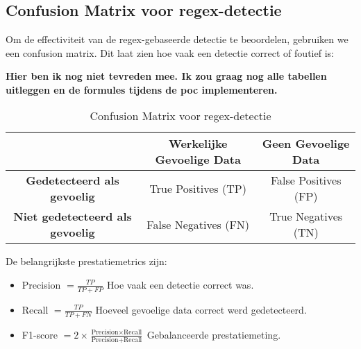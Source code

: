 \section{}
\label{sec:evaluatie_detectie}

\subsection{Confusion Matrix voor regex-detectie}
Om de effectiviteit van de regex-gebaseerde detectie te beoordelen, gebruiken we een confusion matrix. Dit laat zien hoe vaak een detectie correct of foutief is:

\textbf{Hier ben ik nog niet tevreden mee. Ik zou graag nog alle tabellen uitleggen en de formules tijdens de poc implementeren.}

\begin{table}[h]
    \centering
    \begin{tabular}{|c|c|c|}
        \hline
        \textbf{} & \textbf{Werkelijke Gevoelige Data} & \textbf{Geen Gevoelige Data} \\ \hline
        \textbf{Gedetecteerd als gevoelig} & True Positives (TP) & False Positives (FP) \\ \hline
        \textbf{Niet gedetecteerd als gevoelig} & False Negatives (FN) & True Negatives (TN) \\ \hline
    \end{tabular}
    \caption{Confusion Matrix voor regex-detectie}
    \label{tab:confusion_matrix}
\end{table}

De belangrijkste prestatiemetrics zijn:
\begin{itemize}
    \item Precision \( = \frac{TP}{TP + FP} \) Hoe vaak een detectie correct was.
    \item Recall \( = \frac{TP}{TP + FN} \) Hoeveel gevoelige data correct werd gedetecteerd.
    \item F1-score \( = 2 \times \frac{\text{Precision} \times \text{Recall}}{\text{Precision} + \text{Recall}} \) Gebalanceerde prestatiemeting.
\end{itemize}



